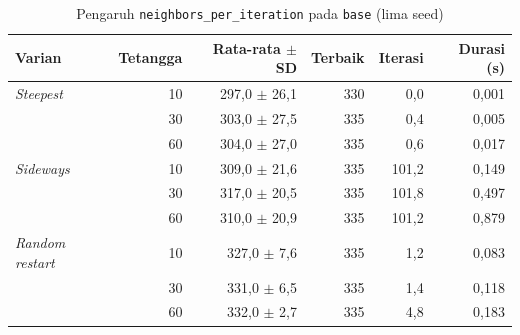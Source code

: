 \begin{table}[H]
    \centering
    \small
    \caption{Pengaruh \texttt{neighbors\_\allowbreak per\_\allowbreak iteration} pada \texttt{base} (lima seed)}
    \label{tab:hc-sweep-neighbors}
    \begin{tabular}{@{}lrrrrr@{}}
        \toprule
        Varian                  & Tetangga & Rata-rata $\pm$ SD & Terbaik & Iterasi & Durasi (s) \\
        \midrule
        \textit{Steepest}       & 10       & 297,0 $\pm$ 26,1   & 330     & 0,0     & 0,001      \\
                                & 30       & 303,0 $\pm$ 27,5   & 335     & 0,4     & 0,005      \\
                                & 60       & 304,0 $\pm$ 27,0   & 335     & 0,6     & 0,017      \\
        \textit{Sideways}       & 10       & 309,0 $\pm$ 21,6   & 335     & 101,2   & 0,149      \\
                                & 30       & 317,0 $\pm$ 20,5   & 335     & 101,8   & 0,497      \\
                                & 60       & 310,0 $\pm$ 20,9   & 335     & 101,2   & 0,879      \\
        \textit{Random restart} & 10       & 327,0 $\pm$ 7,6    & 335     & 1,2     & 0,083      \\
                                & 30       & 331,0 $\pm$ 6,5    & 335     & 1,4     & 0,118      \\
                                & 60       & 332,0 $\pm$ 2,7    & 335     & 4,8     & 0,183      \\
        \bottomrule
    \end{tabular}
\end{table}

